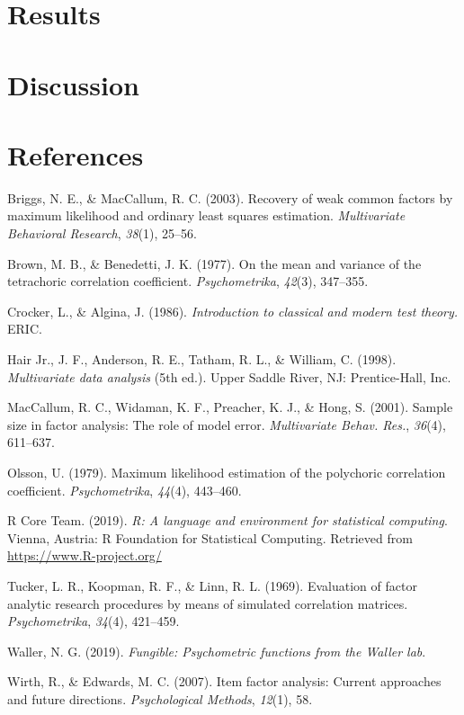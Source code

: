 \documentclass[man]{apa6}
\begin{document}
\hypertarget{results}{%
\section{Results}\label{results}}

\hypertarget{discussion}{%
\section{Discussion}\label{discussion}}

\newpage

\hypertarget{references}{%
\section{References}\label{references}}

\begingroup
\setlength{\parindent}{-0.5in}
\setlength{\leftskip}{0.5in}

\hypertarget{refs}{}
\leavevmode\hypertarget{ref-briggs2003}{}%
Briggs, N. E., \& MacCallum, R. C. (2003). Recovery of weak common factors by maximum likelihood and ordinary least squares estimation. \emph{Multivariate Behavioral Research}, \emph{38}(1), 25--56.

\leavevmode\hypertarget{ref-brown1977mean}{}%
Brown, M. B., \& Benedetti, J. K. (1977). On the mean and variance of the tetrachoric correlation coefficient. \emph{Psychometrika}, \emph{42}(3), 347--355.

\leavevmode\hypertarget{ref-CrockerAlgina}{}%
Crocker, L., \& Algina, J. (1986). \emph{Introduction to classical and modern test theory.} ERIC.

\leavevmode\hypertarget{ref-hair1998}{}%
Hair Jr., J. F., Anderson, R. E., Tatham, R. L., \& William, C. (1998). \emph{Multivariate data analysis} (5th ed.). Upper Saddle River, NJ: Prentice-Hall, Inc.

\leavevmode\hypertarget{ref-maccallum2001a}{}%
MacCallum, R. C., Widaman, K. F., Preacher, K. J., \& Hong, S. (2001). Sample size in factor analysis: The role of model error. \emph{Multivariate Behav. Res.}, \emph{36}(4), 611--637.

\leavevmode\hypertarget{ref-olsson1979maximum}{}%
Olsson, U. (1979). Maximum likelihood estimation of the polychoric correlation coefficient. \emph{Psychometrika}, \emph{44}(4), 443--460.

\leavevmode\hypertarget{ref-R-base}{}%
R Core Team. (2019). \emph{R: A language and environment for statistical computing}. Vienna, Austria: R Foundation for Statistical Computing. Retrieved from \url{https://www.R-project.org/}

\leavevmode\hypertarget{ref-tucker1969}{}%
Tucker, L. R., Koopman, R. F., \& Linn, R. L. (1969). Evaluation of factor analytic research procedures by means of simulated correlation matrices. \emph{Psychometrika}, \emph{34}(4), 421--459.

\leavevmode\hypertarget{ref-waller2019a}{}%
Waller, N. G. (2019). \emph{Fungible: Psychometric functions from the Waller lab}.

\leavevmode\hypertarget{ref-wirth2007item}{}%
Wirth, R., \& Edwards, M. C. (2007). Item factor analysis: Current approaches and future directions. \emph{Psychological Methods}, \emph{12}(1), 58.

\endgroup
\end{document}
